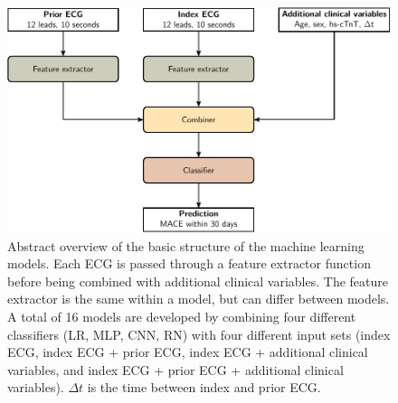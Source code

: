 \documentclass[preprint]{elsarticle}
\begin{document}
\begin{figure}[h!]
\includegraphics[width=\linewidth]{figures/overview.pdf}
\centering
\caption{Abstract overview of the basic structure of the machine learning models. Each ECG is passed through a feature extractor function before being combined with additional clinical variables. The feature extractor is the same within a model, but can differ between models. A total of 16 models are developed by combining four different classifiers (LR, MLP, CNN, RN) with four different input sets (index ECG, index ECG + prior ECG, index ECG + additional clinical variables, and index ECG + prior ECG + additional clinical variables). $\Delta t$ is the time between index and prior ECG.}

\label{fig:model:overview}
\end{figure}
\end{document}
